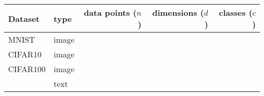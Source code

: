 \begin{tabular}{llrrr}
    \toprule
    Dataset  & type & data points ($n$) & dimensions ($d$) & classes ($c$) \\
    \midrule
    MNIST    & image & \\
    CIFAR10  & image & \\
    CIFAR100 & image & \\
     & text & \\
    \bottomrule
\end{tabular}
\caption{
}

